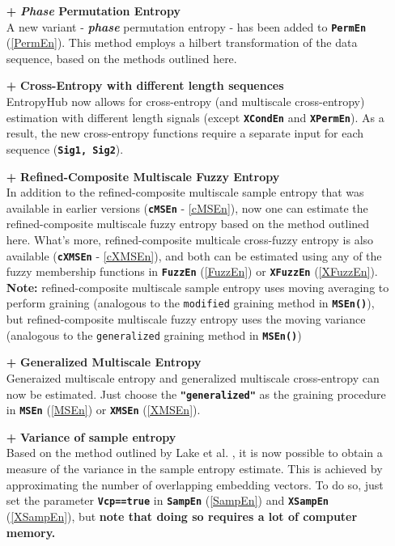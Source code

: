 \documentclass[12pt, a4paper, titlepage, openany]{book}
\begin{document}
\begin{itemize}
\item[\textbf{+}] \textbf{\emph{Phase} Permutation Entropy} \\
A new variant - \textbf{\textit{phase}} permutation entropy - has been added to \texttt{\textbf{PermEn}} (\ref{PermEn}).
This method employs a hilbert transformation of the data sequence, based on the methods outlined here.

\item[\textbf{+}] \textbf{Cross-Entropy with different length sequences}\\
EntropyHub now allows for cross-entropy (and multiscale cross-entropy) estimation with different length signals (except \texttt{\textbf{XCondEn}} and \texttt{\textbf{XPermEn}}).
As a result, the new cross-entropy functions require a separate input for each sequence (\texttt{\textbf{Sig1, Sig2}}).

\item[\textbf{+}] \textbf{Refined-Composite Multiscale Fuzzy Entropy}\\
In addition to the refined-composite multiscale sample entropy that was available in earlier versions (\textbf{\texttt{cMSEn}} - \ref{cMSEn}), now one can estimate the refined-composite multiscale fuzzy entropy based on the method outlined here.
What’s more, refined-composite multicale cross-fuzzy entropy is also available (\textbf{\texttt{cXMSEn}} - \ref{cXMSEn}), and both can be estimated using any of the fuzzy membership functions in \texttt{\textbf{FuzzEn}} (\ref{FuzzEn}) or \texttt{\textbf{XFuzzEn}} (\ref{XFuzzEn}).
\\ \textbf{Note:} refined-composite multiscale sample entropy uses moving averaging to perform graining (analogous to the \texttt{modified} graining method in \texttt{\textbf{MSEn()}}), but refined-composite multiscale fuzzy entropy uses the moving variance (analogous to the \texttt{generalized} graining method in \texttt{\textbf{MSEn()}}) 

\item[\textbf{+}] \textbf{Generalized Multiscale Entropy}\\
Generaized multiscale entropy and generalized multiscale cross-entropy can now be estimated. Just choose the \texttt{\textbf{"generalized"}} as the graining procedure in \texttt{\textbf{MSEn}} (\ref{MSEn}) or \texttt{\textbf{XMSEn}} (\ref{XMSEn}).

\item[\textbf{+}] \textbf{Variance of sample entropy}\\
Based on the method outlined by Lake et al. \cite{Samp2}, it is now possible to obtain a measure of the variance in the sample entropy estimate.
This is achieved by approximating the number of overlapping embedding vectors.
To do so, just set the parameter \texttt{\textbf{Vcp==true}} in \texttt{\textbf{SampEn}} (\ref{SampEn}) and \texttt{\textbf{XSampEn}} (\ref{XSampEn}), but \textbf{note that doing so requires a lot of computer memory.}
\end{itemize} 
\end{document}
